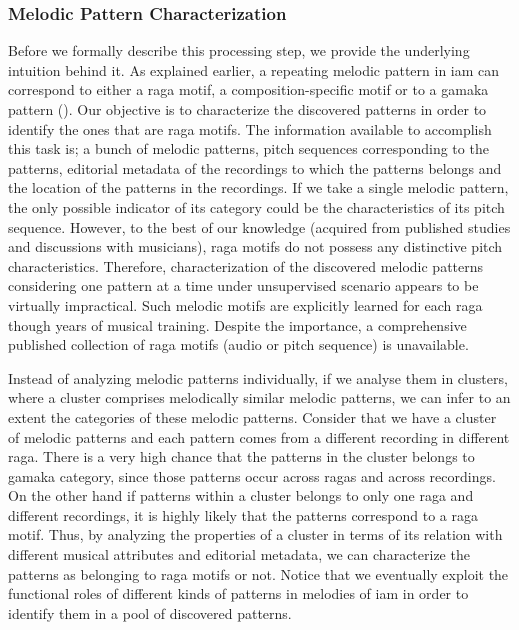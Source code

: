 {\subsubsection{Melodic Pattern Characterization}
\label{pattern_characterization}

Before we formally describe this processing step, we provide the underlying intuition behind it. As explained earlier, a repeating melodic pattern in \gls{iam} can correspond to either a \gls{raga} motif, a composition-specific motif or to a \gls{gamaka} pattern (). Our objective is to characterize the discovered patterns in order to identify the ones that are \gls{raga} motifs. The information available to accomplish this task is; a bunch of melodic patterns, pitch sequences corresponding to the patterns, editorial metadata of the recordings to which the patterns belongs and the location of the patterns in the recordings. If we take a single melodic pattern, the only possible indicator of its category could be the characteristics of its pitch sequence. However, to the best of our knowledge (acquired from published studies and discussions with musicians), \gls{raga} motifs do not possess any distinctive pitch characteristics. Therefore, characterization of the discovered melodic patterns considering one pattern at a time under unsupervised scenario appears to be virtually impractical. Such melodic motifs are explicitly learned for each \gls{raga} though years of musical training. Despite the importance, a comprehensive published collection of \gls{raga} motifs (audio or pitch sequence) is unavailable. 

Instead of analyzing melodic patterns individually, if we analyse them in clusters, where a cluster comprises melodically similar melodic patterns, we can infer to an extent the categories of these melodic patterns. Consider that we have a cluster of melodic patterns and each pattern comes from a different recording in different \gls{raga}. There is a very high chance that the patterns in the cluster belongs to \gls{gamaka} category, since those patterns occur across \glspl{raga} and across recordings. On the other hand if patterns within a cluster belongs to only one \gls{raga} and different recordings, it is highly likely that the patterns correspond to a \gls{raga} motif. Thus, by analyzing the properties of a cluster in terms of its relation with different musical attributes and editorial metadata, we can characterize the patterns as belonging to \gls{raga} motifs or not. Notice that we eventually exploit the functional roles of different kinds of patterns in melodies of \gls{iam} in order to identify them in a pool of discovered patterns. 

}

